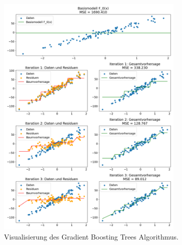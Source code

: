 \begin{figure}[h]
    \centering
    \includegraphics[width=0.8\textwidth]{Images/GBT_Example.png}
    \caption[Visualisierung des Gradient Boosting Trees Algorithmus]{Visualisierung des Gradient Boosting Trees Algorithmus.}
    \label{fig:gbt-example}
\end{figure}